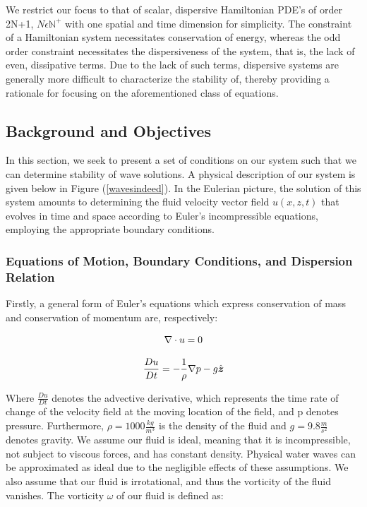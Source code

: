 \documentclass{article}
\begin{document}
 We restrict our focus to that of scalar, dispersive Hamiltonian PDE’s of order 2N+1, \(N \epsilon \mathbb{N}^{+}\) with one spatial and time dimension for simplicity. The constraint of a Hamiltonian system necessitates conservation of energy, whereas the odd order constraint necessitates the dispersiveness of the system, that is, the lack of even, dissipative terms. Due to the lack of such terms, dispersive systems are generally more difficult to characterize the stability of, thereby providing a rationale for focusing on the aforementioned class of equations. \\
 
 
 \subsection{Background and Objectives}
 
  In this section, we seek to present a set of conditions on our system such that we can determine stability of wave solutions. A physical description of our system is given below in Figure (\ref{wavesindeed}). In the Eulerian picture, the solution of this system amounts to determining the fluid velocity vector field \(u(x,z,t)\) that evolves in time and space according to Euler's incompressible equations, employing the appropriate boundary conditions. 
  
  
  \subsubsection{Equations of Motion, Boundary Conditions, and Dispersion Relation}
  
  
  Firstly, a general form of Euler's equations which express conservation of mass and conservation of momentum are, respectively:
  
  \begin{equation} \label{mass}
  \nabla \cdot u = 0  \\
\end{equation}

\begin{equation} \label{eq1}
  \frac{D u}{D t} = -\frac{1}{\rho}\nabla p 
  -g \hat{\boldsymbol{z}}  \\
  \end{equation}

Where \(\frac{D u}{D t}\) denotes the advective derivative, which represents the time rate of change of the velocity field at the moving location of the field, and p denotes pressure. Furthermore, \(\rho = 1000 \frac{kg}{m^3}\) is the density of the fluid and \(g = 9.8 \frac{m}{s^2}\) denotes gravity. We assume our fluid is ideal, meaning that it is incompressible, not subject to viscous forces, and has constant density. Physical water waves can be approximated as ideal due to the negligible effects of these assumptions. We also assume that our fluid is irrotational, and thus the vorticity of the fluid vanishes. The vorticity \( \omega \) of our fluid is defined as: 
\end{document}

